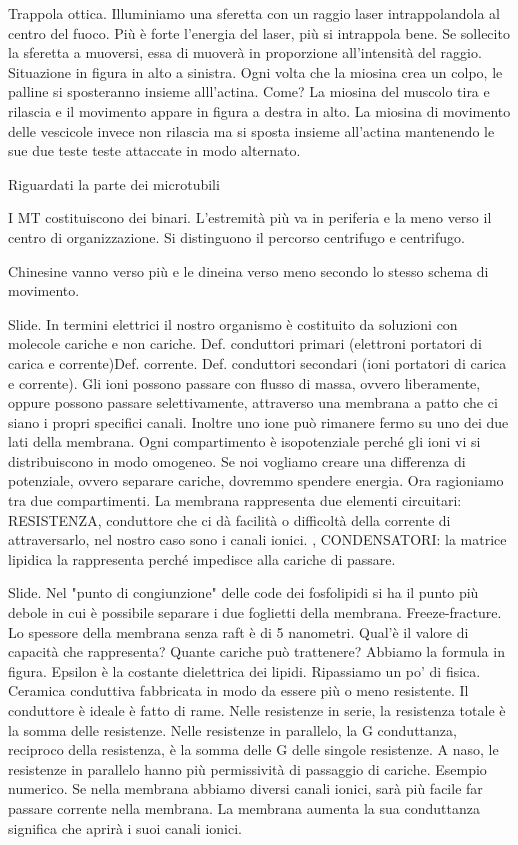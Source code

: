 \documentclass[a4paper,12pt]{article}
\begin{document}
 Trappola ottica. Illuminiamo una sferetta con un raggio laser intrappolandola al centro del fuoco. Più è forte l'energia del laser, più si intrappola bene.
 Se sollecito la sferetta a muoversi, essa di muoverà in proporzione all'intensità del raggio. 
 Situazione in figura in alto a sinistra.
 Ogni volta che la miosina crea un colpo, le palline si sposteranno insieme alll'actina. Come? La miosina del muscolo tira e rilascia e il movimento appare in figura a destra in alto. La miosina di movimento delle vescicole invece non rilascia ma si sposta insieme all'actina mantenendo le sue due teste teste attaccate in modo alternato.


Riguardati la parte dei microtubili 


I MT costituiscono dei binari. L'estremità più va in periferia e la meno verso il centro di organizzazione. Si distinguono il percorso centrifugo e centrifugo.

Chinesine vanno verso più e le dineina verso meno secondo lo stesso schema di movimento.

Slide.
In termini elettrici il nostro organismo è costituito da soluzioni con molecole cariche e non cariche. 
Def. conduttori primari (elettroni portatori di carica e corrente)Def. corrente. Def. conduttori secondari (ioni portatori di carica e corrente).
Gli ioni possono passare con flusso di massa, ovvero liberamente, oppure possono passare selettivamente, attraverso una membrana a patto che ci siano i propri specifici canali. Inoltre uno ione può rimanere fermo su uno dei due lati della membrana.
Ogni compartimento è isopotenziale perché gli ioni vi si distribuiscono in modo omogeneo. Se noi vogliamo creare una differenza di potenziale, ovvero separare cariche, dovremmo spendere energia.
Ora ragioniamo tra due compartimenti. La membrana rappresenta due elementi circuitari: RESISTENZA, conduttore che ci dà facilità o difficoltà della corrente di attraversarlo, nel nostro caso sono i canali ionici. , CONDENSATORI: la matrice lipidica la rappresenta perché impedisce alla cariche di passare.

Slide.
Nel "punto di congiunzione" delle code dei fosfolipidi si ha il punto più debole in cui è possibile separare i due foglietti della membrana. Freeze-fracture. 
Lo spessore della membrana senza raft è di 5 nanometri. Qual'è il valore di capacità che rappresenta? Quante cariche può trattenere? Abbiamo la formula in figura. Epsilon è la costante dielettrica dei lipidi.
Ripassiamo un po' di fisica. Ceramica conduttiva fabbricata in modo da essere più o meno resistente. Il conduttore è ideale è fatto di rame.
 Nelle resistenze in serie, la resistenza totale è la somma delle resistenze.
 Nelle resistenze in parallelo, la G conduttanza, reciproco della resistenza, è la somma delle G delle singole resistenze.
 A naso, le resistenze in parallelo hanno più permissività di passaggio di cariche.
Esempio numerico.
Se nella membrana abbiamo diversi canali ionici, sarà più facile far passare corrente nella membrana. La membrana aumenta la sua conduttanza significa che aprirà i suoi canali ionici.
\end{document}
